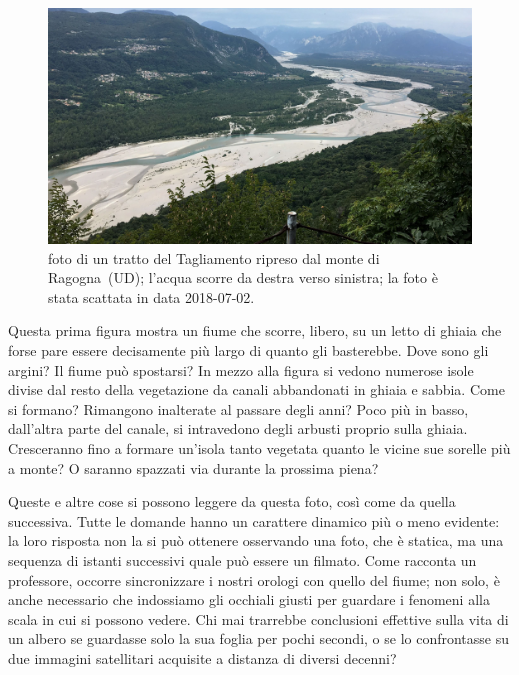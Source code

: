 

\begin{figure}[h]
	\centering
	\includegraphics[width=\textwidth]{files/foto_flagogna.jpg}
	\caption[foto di un tratto del Tagliamento ripreso dal monte di Ragogna]{foto di un tratto del Tagliamento ripreso dal monte di Ragogna~(UD); l'acqua scorre da destra verso sinistra; la foto è stata scattata in data 2018-07-02.
	}
	\label{fig:foto-ragogna}
\end{figure}



Questa prima figura mostra un fiume che scorre, libero, su un letto di ghiaia che forse pare essere decisamente più largo di quanto gli basterebbe. 
Dove sono gli argini? Il fiume può spostarsi? 
%
In mezzo alla figura si vedono numerose isole divise dal resto della vegetazione da canali abbandonati in ghiaia e sabbia. 
Come si formano? Rimangono inalterate al passare degli anni? 
%
Poco più in basso, dall'altra parte del canale, si intravedono degli arbusti proprio sulla ghiaia. 
Cresceranno fino a formare un'isola tanto vegetata quanto le vicine sue sorelle più a monte? O saranno spazzati via durante la prossima piena?

\medskip
Queste e altre cose si possono leggere da questa foto, così come da quella successiva. Tutte le domande hanno un carattere dinamico più o meno evidente: la loro risposta non la si può ottenere osservando una foto, che è statica, ma una sequenza di istanti successivi quale può essere un filmato.
Come racconta un professore, occorre sincronizzare i nostri orologi con quello del fiume; non solo, è anche necessario che indossiamo gli occhiali giusti per guardare i fenomeni alla scala in cui si possono vedere. Chi mai trarrebbe conclusioni effettive sulla vita di un albero se guardasse solo la sua foglia per pochi secondi, o se lo confrontasse su due immagini satellitari acquisite a distanza di diversi decenni?

